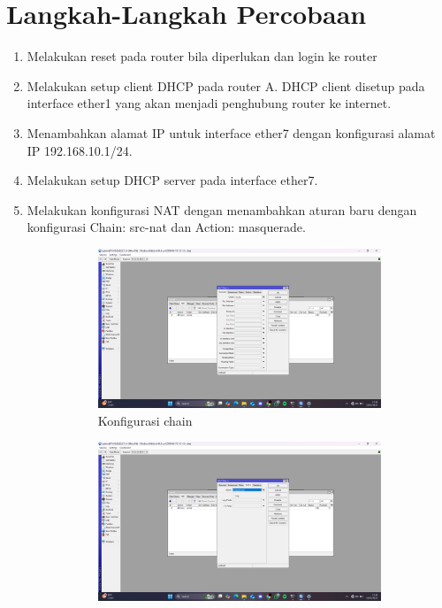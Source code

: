 \section{Langkah-Langkah Percobaan}
\begin{enumerate}
	\item Melakukan reset pada router bila diperlukan dan login ke router
	\item Melakukan setup client DHCP pada router A. DHCP client disetup pada interface ether1 yang akan menjadi penghubung router ke internet.
	\item Menambahkan alamat IP untuk interface ether7 dengan konfigurasi alamat IP 192.168.10.1/24.
	\item Melakukan setup DHCP server pada interface ether7.
	\item Melakukan konfigurasi NAT dengan menambahkan aturan baru dengan konfigurasi Chain: src-nat dan Action: masquerade.
	\begin{figure}[H]
		\centering
		\begin{subfigure}[b]{0.4\linewidth}
			\centering
			\includegraphics[width=\linewidth]{P4/img/nat (2).png}
			\caption{Konfigurasi chain\label{fig:konfigurasiR1}}
		\end{subfigure}
		\begin{subfigure}[b]{0.4\linewidth}
			\centering
			\includegraphics[width=\linewidth]{P4/img/nat (1).png}

\end{subfigure}
\end{figure}
\end{enumerate}
